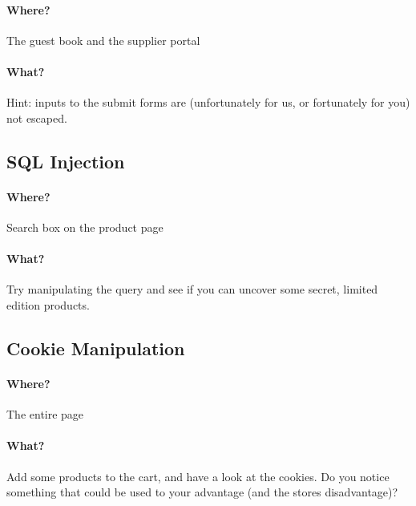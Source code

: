 \documentclass[12pt,a4paper]{article}
\begin{document}
\paragraph{Where?}
The guest book and the supplier portal

\paragraph{What?}
Hint: inputs to the submit forms are (unfortunately for us, or fortunately for you) not escaped.

\subsection{SQL Injection}
\paragraph{Where?}
Search box on the product page

\paragraph{What?}
Try manipulating the query and see if you can uncover some secret, limited edition products.

\subsection{Cookie Manipulation}
\paragraph{Where?}
The entire page

\paragraph{What?}
Add some products to the cart, and have a look at the cookies. Do you notice something that could be used to your advantage (and the stores disadvantage)?
\end{document}
